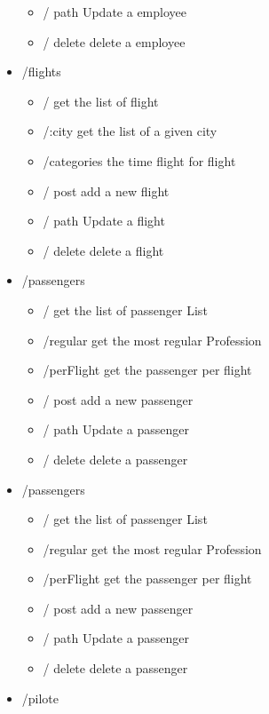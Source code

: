 \documentclass{article}
\begin{document}
\begin{itemize}
\begin{itemize}
                \item / path Update a employee
                \item / delete delete a employee
            \end{itemize}
        \item /flights
            \begin{itemize}
                \item / get the list of flight
                \item /:city get the list of a given city
                \item /categories the time flight for flight
                \item / post add a new flight  
                \item / path Update a flight
                \item / delete delete a flight
            \end{itemize}
        \item /passengers
            \begin{itemize}
                \item / get the list of passenger List
                \item /regular get the most regular Profession
                \item /perFlight get the passenger per flight
                \item / post add a new passenger  
                \item / path Update a passenger
                \item / delete delete a passenger
            \end{itemize}
        \item /passengers
            \begin{itemize}
                \item / get the list of passenger List
                \item /regular get the most regular Profession
                \item /perFlight get the passenger per flight
                \item / post add a new passenger  
                \item / path Update a passenger
                \item / delete delete a passenger
            \end{itemize}
        \item /pilote
            \begin{itemize}

\end{itemize}
\end{itemize}
\end{document}
